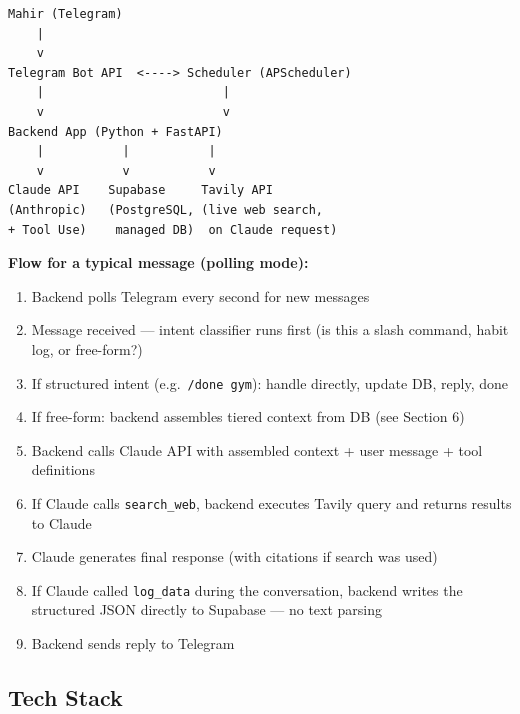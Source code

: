 \documentclass[12pt, a4paper]{article}
\begin{document}
\begin{lstlisting}
Mahir (Telegram)
    |
    v
Telegram Bot API  <----> Scheduler (APScheduler)
    |                         |
    v                         v
Backend App (Python + FastAPI)
    |           |           |
    v           v           v
Claude API    Supabase     Tavily API
(Anthropic)   (PostgreSQL, (live web search,
+ Tool Use)    managed DB)  on Claude request)
\end{lstlisting}

\textbf{Flow for a typical message (polling mode):}
\begin{enumerate}[noitemsep]
    \item Backend polls Telegram every second for new messages
    \item Message received --- intent classifier runs first (is this a slash command, habit log, or free-form?)
    \item If structured intent (e.g.\ \texttt{/done gym}): handle directly, update DB, reply, done
    \item If free-form: backend assembles tiered context from DB (see Section 6)
    \item Backend calls Claude API with assembled context + user message + tool definitions
    \item If Claude calls \texttt{search\_web}, backend executes Tavily query and returns results to Claude
    \item Claude generates final response (with citations if search was used)
    \item If Claude called \texttt{log\_data} during the conversation, backend writes the structured JSON directly to Supabase --- no text parsing
    \item Backend sends reply to Telegram
\end{enumerate}

\subsection{Tech Stack}
\end{document}
